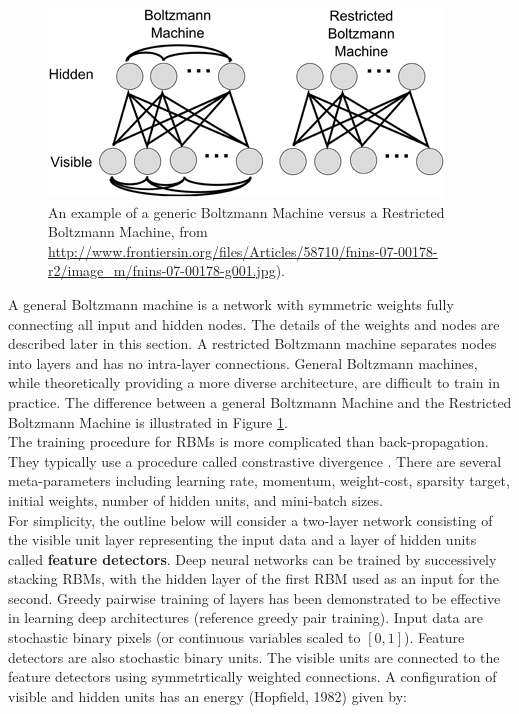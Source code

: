 \begin{figure}[tb]
\centering 
\includegraphics[width=0.5\columnwidth]{Figures/BoltzmannMachines.jpg} 
\caption[A Boltzmann Machine diagram]{An example of a generic Boltzmann Machine versus a Restricted Boltzmann Machine, from \url{http://www.frontiersin.org/files/Articles/58710/fnins-07-00178-r2/image_m/fnins-07-00178-g001.jpg}).} %
\label{fig:BoltzmannMachines} 
\end{figure}

A general Boltzmann machine is a network with symmetric weights fully connecting all input and hidden nodes. The details of the weights and nodes are described later in this section. A restricted Boltzmann machine separates nodes into layers and has no intra-layer connections. General Boltzmann machines, while theoretically providing a more diverse architecture, are difficult to train in practice. The difference between a general Boltzmann Machine and the Restricted Boltzmann Machine is illustrated in Figure \ref{fig:BoltzmannMachines}. \\

The training procedure for RBMs is more complicated than back-propagation. They typically use a procedure called constrastive divergence \cite{Hinton:2002:TPE:639729.639730}. There are several meta-parameters including learning rate, momentum, weight-cost, sparsity target, initial weights, number of hidden units, and mini-batch sizes. \\

For simplicity, the outline below will consider a two-layer network consisting of the visible unit layer representing the input data and a layer of hidden units called \textbf{feature detectors}. Deep neural networks can be trained by successively stacking RBMs, with the hidden layer of the first RBM used as an input for the second. Greedy pairwise training of layers has been demonstrated to be effective in learning deep architectures (reference greedy pair training). Input data are stochastic binary pixels (or continuous variables scaled to $[0,1]$). Feature detectors are also stochastic binary units. The visible units are connected to the feature detectors using symmetrtically weighted connections. A configuration of visible and hidden units has an energy (Hopfield, 1982) given by:


